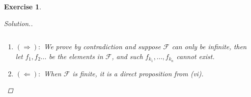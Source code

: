 \documentclass{article}
\theoremstyle{breakstyle}
\newtheorem{exercise}{Exercise}
\newenvironment{solution}
  {\begin{proof}[Solution.]\renewcommand{\qedsymbol}{}}
  {\end{proof}}
\begin{document}
\begin{exercise}
\begin{solution}
\begin{enumerate}[label=({\roman*})]
$$                $$
                \begin{enumerate}[label=({\roman*})]
                    \item $(\Rightarrow):$
                        We prove by contradiction and suppose $\mathcal{F}$ can only be infinite,
                        then let $f_1,f_2\ldots $ be the elements in $\mathcal{F}$, and such $f_{k_1},\ldots ,f_{k_{n}}$ cannot exist.
                    \item $(\Leftarrow):$ 
                        When $\mathcal{F}$ is finite, it is a direct proposition from  \emph{(vi)}.
                \end{enumerate}
        \end{enumerate}
\end{solution}
\end{exercise}
\end{document}
